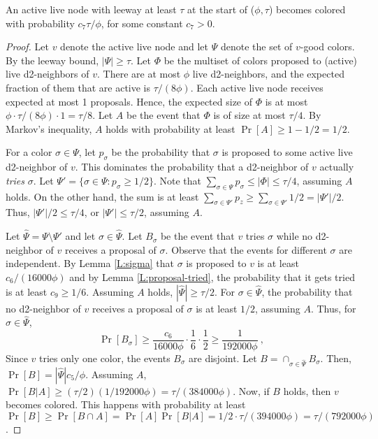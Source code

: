 \begin{lemma}
An active live node with leeway at least $\tau$ at the start of ($\phi,\tau$) becomes colored with probability $c_7 \tau/\phi$, for some constant $c_7 > 0$.
\label{L:progress}
\end{lemma}
\begin{proof}
Let $v$ denote the active live node and let $\Psi$ denote the set of $v$-good colors. By the leeway bound, $|\Psi| \ge \tau$. 
Let $\Phi$ be the multiset of colors proposed to (active) live d2-neighbors of $v$.
There are at most $\phi$ live d2-neighbors, and the expected fraction of them that are active is $\tau/(8\phi)$. Each active live node receives expected at most 1 proposals. Hence, the expected size of $\Phi$ is at most $\phi \cdot \tau/(8\phi) \cdot 1 = \tau/8$.
Let $A$ be the event that $\Phi$ is of size at most $\tau/4$. By Markov's inequality, $A$ holds with probability at least $\Pr[A] \ge 1-1/2 = 1/2$.

For a color $\sigma \in \Psi$, let $p_\sigma$ be the probability that $\sigma$ is proposed to some active live d2-neighbor of $v$. This dominates the probability that a d2-neighbor of $v$ actually \emph{tries} $\sigma$. 
Let $\Psi' = \{\sigma \in \Psi : p_{\sigma} \ge 1/2\}$. 
Note that $\sum_{\sigma \in \Psi} p_{\sigma} \le |\Phi| \le \tau/4$, assuming $A$ holds. 
On the other hand, the sum is at least $\sum_{\sigma \in \Psi'} p_{z} \ge \sum_{\sigma \in \Psi'} 1/2 = |\Psi'|/2$. Thus, $|\Psi'|/2 \le \tau/4$, or $|\Psi'| \le \tau/2$, assuming $A$.

Let $\hat{\Psi} = \Psi \setminus \Psi'$ and let $\sigma \in \hat{\Psi}$. Let $B_\sigma$ be the event that $v$ tries $\sigma$ while no d2-neighbor of $v$ receives a proposal of $\sigma$. Observe that the events for different $\sigma$ are independent.
By Lemma \ref{L:sigma} that $\sigma$ is proposed to $v$ is at least $c_6/(16000\phi)$ and by Lemma \ref{L:proposal-tried}, the probability that it gets tried is at least $c_9 \ge 1/6$. 
Assuming $A$ holds, $|\hat{\Psi}| \ge \tau/2$.
For $\sigma \in \hat{\Psi}$, the probability that no d2-neighbor of $v$ receives a proposal of $\sigma$ is at least $1/2$, assuming $A$.
Thus, for $\sigma \in \hat{\Psi}$,
\[ \Pr[B_\sigma] \ge \frac{c_6}{16000\phi} \cdot \frac{1}{6} \cdot \frac{1}{2} \ge \frac{1}{192000 \phi}\ , \]
Since $v$ tries only one color, the events $B_\sigma$ are disjoint.
Let $B = \cap_{\sigma \in \hat{\Psi}} B_\sigma$.
Then, $\Pr[B] = |\hat{\Psi}|c_5/\phi$. 
Assuming $A$, $\Pr[B|A] \ge (\tau/2)(1/192000\phi) = \tau/(384000\phi)$.
Now, if $B$ holds, then $v$ becomes colored.
This happens with probability at least
$\Pr[B] \ge \Pr[B \cap A] = \Pr[A] \Pr[B|A] = 1/2 \cdot \tau/(394000\phi) = \tau/(792000\phi)$.
\end{proof}

